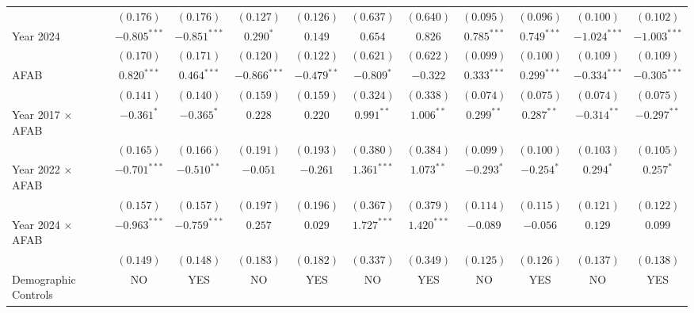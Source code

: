 \begin{table}[htpb]
{\begin{tabular}{l c c c c c c c c c c}
                        & $(0.176)$      & $(0.176)$      & $(0.127)$      & $(0.126)$     & $(0.637)$     & $(0.640)$     & $(0.095)$      & $(0.096)$      & $(0.100)$      & $(0.102)$      \\
Year 2024               & $-0.805^{***}$ & $-0.851^{***}$ & $0.290^{*}$    & $0.149$       & $0.654$       & $0.826$       & $0.785^{***}$  & $0.749^{***}$  & $-1.024^{***}$ & $-1.003^{***}$ \\
                        & $(0.170)$      & $(0.171)$      & $(0.120)$      & $(0.122)$     & $(0.621)$     & $(0.622)$     & $(0.099)$      & $(0.100)$      & $(0.109)$      & $(0.109)$      \\
AFAB                    & $0.820^{***}$  & $0.464^{***}$  & $-0.866^{***}$ & $-0.479^{**}$ & $-0.809^{*}$  & $-0.322$      & $0.333^{***}$  & $0.299^{***}$  & $-0.334^{***}$ & $-0.305^{***}$ \\
                        & $(0.141)$      & $(0.140)$      & $(0.159)$      & $(0.159)$     & $(0.324)$     & $(0.338)$     & $(0.074)$      & $(0.075)$      & $(0.074)$      & $(0.075)$      \\
Year 2017 $\times$ AFAB & $-0.361^{*}$   & $-0.365^{*}$   & $0.228$        & $0.220$       & $0.991^{**}$  & $1.006^{**}$  & $0.299^{**}$   & $0.287^{**}$   & $-0.314^{**}$  & $-0.297^{**}$  \\
                        & $(0.165)$      & $(0.166)$      & $(0.191)$      & $(0.193)$     & $(0.380)$     & $(0.384)$     & $(0.099)$      & $(0.100)$      & $(0.103)$      & $(0.105)$      \\
Year 2022 $\times$ AFAB & $-0.701^{***}$ & $-0.510^{**}$  & $-0.051$       & $-0.261$      & $1.361^{***}$ & $1.073^{**}$  & $-0.293^{*}$   & $-0.254^{*}$   & $0.294^{*}$    & $0.257^{*}$    \\
                        & $(0.157)$      & $(0.157)$      & $(0.197)$      & $(0.196)$     & $(0.367)$     & $(0.379)$     & $(0.114)$      & $(0.115)$      & $(0.121)$      & $(0.122)$      \\
Year 2024 $\times$ AFAB & $-0.963^{***}$ & $-0.759^{***}$ & $0.257$        & $0.029$       & $1.727^{***}$ & $1.420^{***}$ & $-0.089$       & $-0.056$       & $0.129$        & $0.099$        \\
                        & $(0.149)$      & $(0.148)$      & $(0.183)$      & $(0.182)$     & $(0.337)$     & $(0.349)$     & $(0.125)$      & $(0.126)$      & $(0.137)$      & $(0.138)$      \\
\hline
Demographic Controls    & NO             & YES            & NO             & YES           & NO            & YES           & NO             & YES            & NO             & YES            \\

\end{tabular}}
\end{table}
